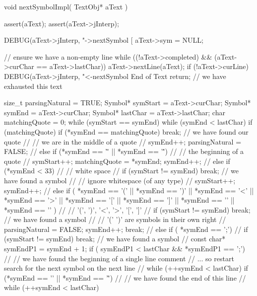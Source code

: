 \startCCode
void nextSymbolImpl(
  TextObj* aText
) {
  assert(aText);
  assert(aText->jInterp);

  DEBUG(aText->jInterp,
    "->nextSymbol [%
  aText->sym = NULL;

  // ensure we have a non-empty line
  while ((!aText->completed) && (aText->curChar == aText->lastChar)) {
    aText->nextLine(aText);
  }
  if (!aText->curLine) {
    DEBUG(aText->jInterp, "<-nextSymbol End of Text %
    return; // we have exhausted this text
  }

  size_t  parsingNatural = TRUE;
  Symbol* symStart       = aText->curChar;
  Symbol* symEnd         = aText->curChar;
  Symbol* lastChar       = aText->lastChar;
  char    matchingQuote  = 0;
  while (symStart == symEnd) {
    while (symEnd < lastChar) {
      if (matchingQuote) {
        if (*symEnd == matchingQuote) break; // we have found our quote
        //
        // we are in the middle of a quote
        //
        symEnd++;
        parsingNatural = FALSE;
        //
      } else if (*symEnd == '\"' || *symEnd == '\'') {
        //
        // the beginning of a quote
        //
        symStart++;
        matchingQuote = *symEnd;
        symEnd++;
        //
      } else if (*symEnd < 33) {
        //
        // white space
        //
        if (symStart != symEnd)  break; // we have found a symbol
        //
        // ignore whitespace (of any type)
        //
        symStart++;
        symEnd++;
        //
      } else if (
        *symEnd == '('  || *symEnd == ')'  ||
        *symEnd == '<'  || *symEnd == '>'  ||
        *symEnd == '['  || *symEnd == ']'  ||
        *symEnd == '{'  || *symEnd == '}' ) {
        //
        // '(', ')', '<', '>', '[', ']'
        //
        if (symStart != symEnd) break; // we have found a symbol
        //
        // '(' ')' are symbols in their own right
        //
        parsingNatural = FALSE;
        symEnd++;
        break;
        //
      } else if ( *symEnd == ';') {
        //
        if (symStart != symEnd) break; // we have found a symbol
        //
        const char* symEndP1 = symEnd + 1;
        if ( symEndP1 < lastChar && *symEndP1 == ';') {
          //
          // we have found the beginning of a single line comment
          // ... so restart search for the next symbol on the next line
          //
          while (++symEnd < lastChar) {
            if (*symEnd == '\n' || *symEnd == '\r') {
              //
              // we have found the end of this line
              //
              while (++symEnd < lastChar) {
}}}}}}}}
